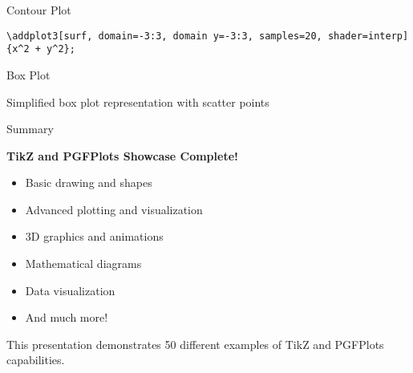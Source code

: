 \documentclass{beamer}
\begin{document}
\begin{frame}{Contour Plot}
\begin{center}
\end{center}

\footnotesize
\texttt{\textbackslash addplot3[surf, domain=-3:3, domain y=-3:3, samples=20, shader=interp] \{x\textasciicircum 2 + y\textasciicircum 2\};}
\end{frame}

\begin{frame}{Box Plot}
\begin{center}
\end{center}

\footnotesize
Simplified box plot representation with scatter points
\end{frame}

\begin{frame}{Summary}
\begin{center}
\Large
\textbf{TikZ and PGFPlots Showcase Complete!}

\vspace{1cm}

\begin{itemize}
    \item Basic drawing and shapes
    \item Advanced plotting and visualization
    \item 3D graphics and animations
    \item Mathematical diagrams
    \item Data visualization
    \item And much more!
\end{itemize}

\vspace{1cm}

\footnotesize
This presentation demonstrates 50 different examples of TikZ and PGFPlots capabilities.
\end{center}
\end{frame}
\end{document}

